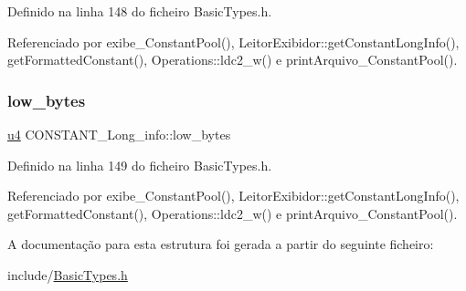 Definido na linha 148 do ficheiro Basic\+Types.\+h.



Referenciado por exibe\+\_\+\+Constant\+Pool(), Leitor\+Exibidor\+::get\+Constant\+Long\+Info(), get\+Formatted\+Constant(), Operations\+::ldc2\+\_\+w() e print\+Arquivo\+\_\+\+Constant\+Pool().

\mbox{\label{structCONSTANT__Long__info_aafb2c41b1cf577fab97718cf51e0c00f}} 
\subsubsection{\texorpdfstring{low\+\_\+bytes}{low\_bytes}}
{\footnotesize\ttfamily \hyperlink{BasicTypes_8h_ae5be1f726785414dd1b77d60df074c9d}{u4} C\+O\+N\+S\+T\+A\+N\+T\+\_\+\+Long\+\_\+info\+::low\+\_\+bytes}



Definido na linha 149 do ficheiro Basic\+Types.\+h.



Referenciado por exibe\+\_\+\+Constant\+Pool(), Leitor\+Exibidor\+::get\+Constant\+Long\+Info(), get\+Formatted\+Constant(), Operations\+::ldc2\+\_\+w() e print\+Arquivo\+\_\+\+Constant\+Pool().



A documentação para esta estrutura foi gerada a partir do seguinte ficheiro\+:\begin{DoxyCompactItemize}
\item 
include/\hyperlink{BasicTypes_8h}{Basic\+Types.\+h}\end{DoxyCompactItemize}
